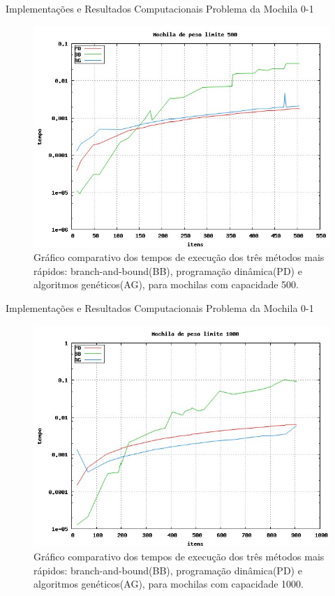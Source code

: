 \documentclass[slidestop,compress,mathserif]{beamer}
\begin{document}
\begin{frame} {Implementações e Resultados Computacionais} {Problema da Mochila 0-1}

\scriptsize
\begin{figure}[htp]
	\centering
	\includegraphics[scale=0.3]{images/w500.jpg}
	\caption{\tiny{Gráfico comparativo dos tempos de execução dos três métodos mais rápidos: branch-and-bound(BB), programação dinâmica(PD) e algoritmos genéticos(AG), para mochilas com capacidade 500.}}
\end{figure}

\end{frame}


\begin{frame} {Implementações e Resultados Computacionais} {Problema da Mochila 0-1}

\scriptsize
\begin{figure}[htp]
	\centering
	\includegraphics[scale=0.3]{images/w1000.jpg}
	\caption{\tiny{Gráfico comparativo dos tempos de execução dos três métodos mais rápidos: branch-and-bound(BB), programação dinâmica(PD) e algoritmos genéticos(AG), para mochilas com capacidade 1000.}}
\end{figure}

\end{frame}
\end{document}
